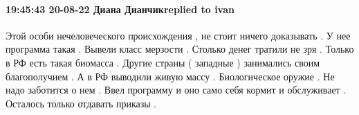  
 
 
 
 

\paragraph{19:45:43 20-08-22 Диана Дианчикreplied to ivan}

Этой особи нечеловеческого происхождения , не стоит ничего  доказывать . У нее
программа такая . Вывели класс мерзости . Столько денег тратили не зря . Только
в РФ есть такая биомасса . Другие страны ( западные ) занимались своим
благополучием . А в РФ выводили живую массу . Биологическое оружие . Не надо
заботится о нем . Ввел программу и оно само  себя кормит и обслуживает .
Осталось только отдавать приказы .
